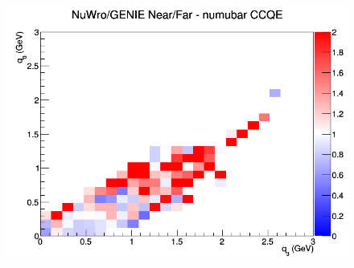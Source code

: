 \documentclass[12pt]{article}
\begin{document}
\begin{figure}[h]
\endminipage
{}
\includegraphics[width=\linewidth]{eff_q0_q3/GAr/ratios/CCQE_NuWro_GENIE_numubar_NF_q3_q0.png}
\endminipage
\newline
\end{figure}
\clearpage
\end{document}
